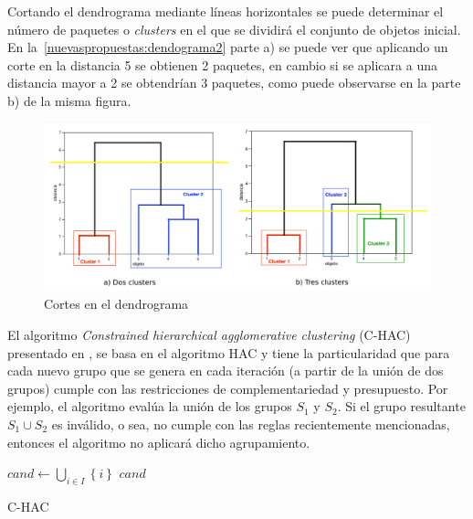 Cortando el dendrograma mediante líneas horizontales se puede determinar el número de paquetes o \emph{clusters} en el que se dividirá el conjunto de objetos inicial. En la~\autoref{nuevaspropuestas:dendograma2} parte a) se puede ver que aplicando un corte en la distancia 5 se obtienen 2 paquetes, en cambio si se aplicara a una distancia mayor a 2 se obtendrían 3 paquetes, como puede observarse en la parte b) de la misma figura.

\begin{figure}[H]
  \centering
    \includegraphics[width=1\textwidth]{img/dendograma02.png}
  \caption{Cortes en el dendrograma}
  \label{nuevaspropuestas:dendograma2}
\end{figure}

El algoritmo \textit{Constrained hierarchical agglomerative clustering} (C-HAC) presentado en \cite{journals/tkde/Amer-YahiaBCFMZ14}, se basa en el algoritmo HAC y tiene la particularidad que para cada nuevo grupo que se genera en cada iteración (a partir de la unión de dos grupos) cumple con las restricciones de complementariedad y presupuesto. Por ejemplo, el algoritmo evalúa la unión de los grupos $S_1$ y $S_2$. Si el grupo resultante $S_1 \cup S_2$ es inválido, o sea, no cumple con las reglas recientemente mencionadas, entonces el algoritmo no aplicará dicho agrupamiento.

\begin{center}
	\begin{algorithm}[H]
	\DontPrintSemicolon
	\SetAlgoLined
		$cand \leftarrow \bigcup_{i \in I}\left\{i\right\}$\; \label{alg:C-HAC:init}
		\Return $cand$\;
	\caption{C-HAC}\label{alg:C-HAC}
	\end{algorithm}
\end{center}

